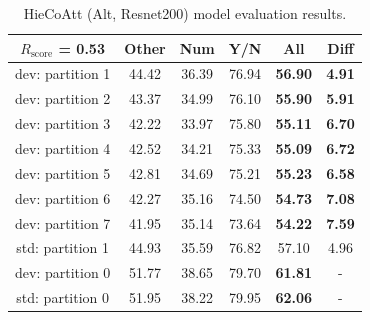 \documentclass[letterpaper]{article}
\newcommand{\rscore}{}\def\rscore/{$R_{\text{score}}$}
\begin{document}
\begin{table}
\begin{subtable}{0.49\linewidth}
		\begin{tabular}{c | c c c c | c}
			\rscore/ = \textbf{0.53} & Other & Num   & Y/N   & All            & Diff          \\ [0.5ex]
			\hline
			dev: partition 1         & 44.42 & 36.39 & 76.94 & \textbf{56.90} & \textbf{4.91} \\
			dev: partition 2         & 43.37 & 34.99 & 76.10 & \textbf{55.90} & \textbf{5.91} \\
			dev: partition 3         & 42.22 & 33.97 & 75.80 & \textbf{55.11} & \textbf{6.70} \\
			dev: partition 4         & 42.52 & 34.21 & 75.33 & \textbf{55.09} & \textbf{6.72} \\
			dev: partition 5         & 42.81 & 34.69 & 75.21 & \textbf{55.23} & \textbf{6.58} \\
			dev: partition 6         & 42.27 & 35.16 & 74.50 & \textbf{54.73} & \textbf{7.08} \\
			dev: partition 7         & 41.95 & 35.14 & 73.64 & \textbf{54.22} & \textbf{7.59} \\
			\hline
			std: partition 1         & 44.93 & 35.59 & 76.82 & 57.10          & 4.96          \\
			\hline
			dev: partition 0         & 51.77 & 38.65 & 79.70 & \textbf{61.81} & -             \\
			std: partition 0         & 51.95 & 38.22 & 79.95 & \textbf{62.06} & -             \\
			\hline
		\end{tabular}
		\caption{HieCoAtt (Alt, Resnet200) model evaluation results.}


\end{subtable}
\end{table}
\end{document}
